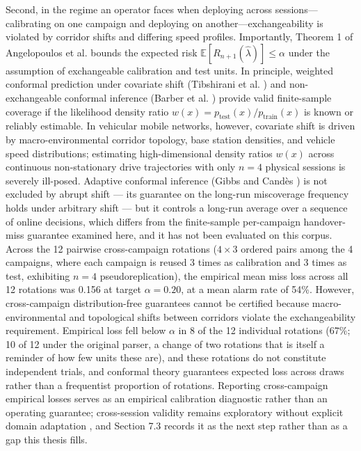Second, in the regime an operator faces when deploying across sessions---calibrating on one campaign and deploying on another---exchangeability is violated by corridor shifts and differing speed profiles. Importantly, Theorem 1 of Angelopoulos et al. \cite{ref21} bounds the expected risk $\mathbb{E}[R_{n+1}(\hat{\lambda})] \le \alpha$ under the assumption of exchangeable calibration and test units. In principle, weighted conformal prediction under covariate shift (Tibshirani et al. \cite{ref51}) and non-exchangeable conformal inference (Barber et al. \cite{ref52}) provide valid finite-sample coverage if the likelihood density ratio $w(x) = p_{\text{test}}(x) / p_{\text{train}}(x)$ is known or reliably estimable. In vehicular mobile networks, however, covariate shift is driven by macro-environmental corridor topology, base station densities, and vehicle speed distributions; estimating high-dimensional density ratios $w(x)$ across continuous non-stationary drive trajectories with only $n=4$ physical sessions is severely ill-posed. Adaptive conformal inference (Gibbs and Cand\`es \cite{ref53}) is not excluded by abrupt shift --- its guarantee on the long-run miscoverage frequency holds under arbitrary shift --- but it controls a long-run average over a sequence of online decisions, which differs from the finite-sample per-campaign handover-miss guarantee examined here, and it has not been evaluated on this corpus. Across the 12 pairwise cross-campaign rotations ($4 \times 3$ ordered pairs among the 4 campaigns, where each campaign is reused 3 times as calibration and 3 times as test, exhibiting $n=4$ pseudoreplication), the empirical mean miss loss across all 12 rotations was 0.156 at target $\alpha = 0.20$, at a mean alarm rate of 54\%. However, cross-campaign distribution-free guarantees cannot be certified because macro-environmental and topological shifts between corridors violate the exchangeability requirement. Empirical loss fell below $\alpha$ in 8 of the 12 individual rotations (67\%; 10 of 12 under the original parser, a change of two rotations that is itself a reminder of how few units these are), and these rotations do not constitute independent trials, and conformal theory guarantees expected loss across draws rather than a frequentist proportion of rotations. Reporting cross-campaign empirical losses serves as an empirical calibration diagnostic rather than an operating guarantee; cross-session validity remains exploratory without explicit domain adaptation \cite{ref47}, and Section 7.3 records it as the next step rather than as a gap this thesis fills.

